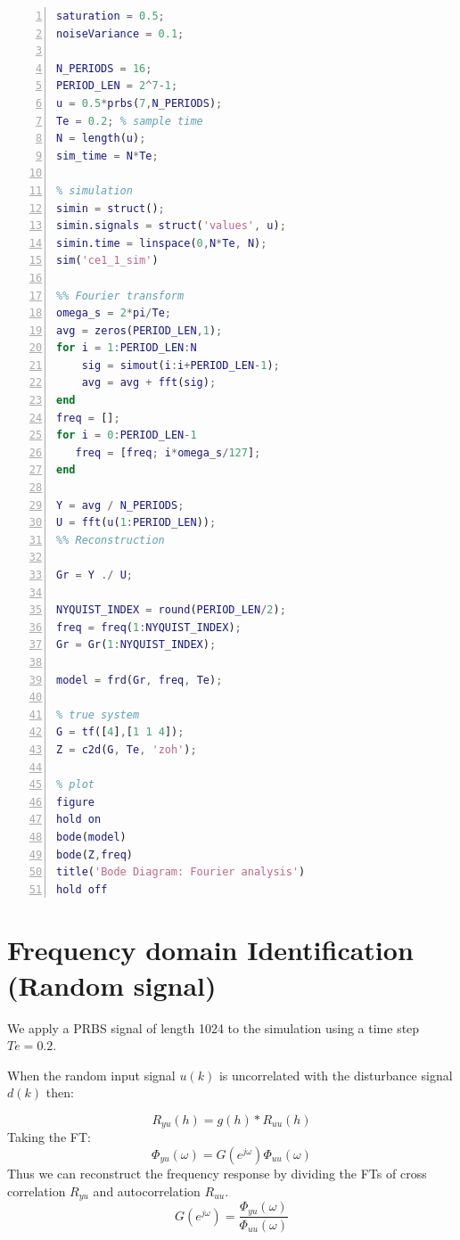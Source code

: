 \documentclass[a4paper,11pt]{article}
\begin{document}
\begin{lstlisting}[language=Matlab,numbers=left,caption=Fourier analysis method,label=lst:fourier_analysis_code]
% input signal
saturation = 0.5;
noiseVariance = 0.1;

N_PERIODS = 16;
PERIOD_LEN = 2^7-1;
u = 0.5*prbs(7,N_PERIODS);
Te = 0.2; % sample time
N = length(u);
sim_time = N*Te;

% simulation
simin = struct();
simin.signals = struct('values', u);
simin.time = linspace(0,N*Te, N);
sim('ce1_1_sim')

%% Fourier transform
omega_s = 2*pi/Te;
avg = zeros(PERIOD_LEN,1);
for i = 1:PERIOD_LEN:N
    sig = simout(i:i+PERIOD_LEN-1);
    avg = avg + fft(sig);
end
freq = [];
for i = 0:PERIOD_LEN-1
   freq = [freq; i*omega_s/127];
end

Y = avg / N_PERIODS;
U = fft(u(1:PERIOD_LEN));
%% Reconstruction

Gr = Y ./ U;

NYQUIST_INDEX = round(PERIOD_LEN/2);
freq = freq(1:NYQUIST_INDEX);
Gr = Gr(1:NYQUIST_INDEX);

model = frd(Gr, freq, Te);

% true system
G = tf([4],[1 1 4]);
Z = c2d(G, Te, 'zoh');

% plot
figure
hold on
bode(model)
bode(Z,freq)
title('Bode Diagram: Fourier analysis')
hold off
\end{lstlisting}

\section{Frequency domain Identification (Random signal)}
We apply a PRBS signal of length 1024 to the simulation using a time step $Te = 0.2$.

When the random input signal $u(k)$ is uncorrelated with the disturbance signal $d(k)$ then:

\begin{equation*}
R_{yu}(h) = g(h)*R_{uu}(h)
\end{equation*}
Taking the FT:
\begin{equation*}
\Phi_{yu}(\omega) = G(e^{j\omega})\Phi_{uu}(\omega)
\end{equation*}
Thus we can reconstruct the frequency response by dividing the FTs of cross correlation $R_{yu}$ and autocorrelation $R_{uu}$.
\begin{equation*}
G(e^{j\omega}) = \frac{\Phi_{yu}(\omega)}{\Phi_{uu}(\omega)}
\end{equation*}
\end{document}
